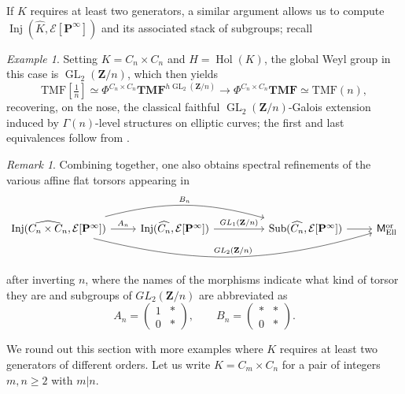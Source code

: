 \documentclass[11pt, a4paper]{article}
\newcommand{\Ell}{\mathrm{Ell}}
\newcommand{\ori}{\mathrm{or}}
\DeclareMathOperator{\GL}{GL}
\newcommand{\1}{\mathbf{1}}
\newcommand{\gTMF}{{\mathbf{TMF}}}
\newcommand{\TMF}{\mathrm{TMF}}
\DeclareMathOperator{\Hol}{Hol}
\DeclareMathOperator{\Inj}{Inj}
\DeclareMathOperator{\Sub}{Sub}
\newcommand{\dual}[1]{{\widehat{#1}}}
\newcommand{\calE}{\mathcal{E}}
\newcommand{\M}{\mathsf{M}}
\renewcommand{\P}{\mathbf{P}}
\newcommand{\Z}{\mathbf{Z}}
\newcommand{\Ga}{\Gamma}
\theoremstyle{plain}
\theoremstyle{definition}
\theoremstyle{remark}\numberwithin{equation}{section}
\newtheorem{example}[equation]{Example}
\newtheorem{remark}[equation]{Remark}
\begin{document}
If $K$ requires at least two generators, a similar argument allows us to compute $\Inj(\dual{K}, \calE[\P^\infty])$ and its associated stack of subgroups; recall 

\begin{example}
    Setting $K=C_n\times C_n$ and $H=\Hol(K)$, the global Weyl group in this case is $\GL_2(\Z/n)$, which then yields
    \[\TMF[\tfrac{1}{n}] \simeq \Phi^{C_n\times C_n} \gTMF^{h\GL_2(\Z/n)}  \to \Phi^{C_n\times C_n} \gTMF \simeq \TMF(n),\]
    recovering, on the nose, the classical faithful $\GL_2(\Z/n)$-Galois extension induced by $\Ga(n)$-level structures on elliptic curves; the first and last equivalences follow from .
\end{example}

\begin{remark}
    Combining  together, one also obtains spectral refinements of the various affine flat torsors appearing in \cite[(7.4.3)]{km}
    \[\begin{tikzcd}
        {\Inj(\dual{C_n \times C_n}, \calE[\P^\infty])}\ar[r, "{A_n}"]\ar[rrr, "{B_n}", bend left = 15]\ar[rrrr, bend right = 15, "{GL_2(\Z/n)}"]   &   {\Inj(\dual{C_n}, \calE[\P^\infty])}\ar[rr, "{GL_1(\Z/n)}"]  &&   {\Sub(\dual{C_n}, \calE[\P^\infty])}\ar[r]  &   {\M_\Ell^\ori}
    \end{tikzcd} \]
    after inverting $n$, where the names of the morphisms indicate what kind of torsor they are and subgroups of $GL_2(\Z/n)$ are abbreviated as
    \[A_n = \begin{pmatrix}
    1    &  \ast  \\
    0    &  \ast
    \end{pmatrix}, \qquad 
    B_n = \begin{pmatrix}
    \ast    &  \ast  \\
    0    &  \ast
    \end{pmatrix}.\]
\end{remark}

We round out this section with more examples where $K$ requires at least two generators of different orders. Let us write $K=C_m \times C_n$ for a pair of integers $m,n\geq 2$ with $m|n$.
\end{document}
